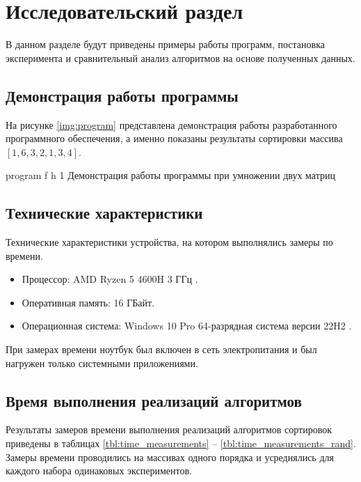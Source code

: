 \chapter{Исследовательский раздел}

В данном разделе будут приведены примеры работы программ, постановка эксперимента и сравнительный анализ алгоритмов на основе полученных данных.

\section{Демонстрация работы программы}


На рисунке \ref{img:program} представлена демонстрация работы разработанного программного обеспечения, а именно показаны результаты сортировки массива $[1, 6, 3, 2, 1, 3, 4]$.  
\clearpage

{program} %
{f} %
{h} %
{1\textwidth} %
{Демонстрация работы программы при умножении двух матриц} %

\clearpage


\section{Технические характеристики}

Технические характеристики устройства, на котором выполнялись замеры по времени.

\begin{itemize}
	\item Процессор: AMD Ryzen 5 4600H 3 ГГц \cite{amd}.
	\item Оперативная память: 16 ГБайт.
	\item Операционная система: Windows 10 Pro 64-разрядная система версии 22H2 \cite{windows}.
\end{itemize}

При замерах времени ноутбук был включен в сеть электропитания и был нагружен только системными приложениями.

\section{Время выполнения реализаций алгоритмов}

Результаты замеров времени выполнения реализаций алгоритмов сортировок приведены в таблицах \ref{tbl:time_measurements} -- \ref{tbl:time_measurements_rand}.
Замеры времени проводились на массивах одного порядка и усреднялись для каждого набора одинаковых экспериментов.

